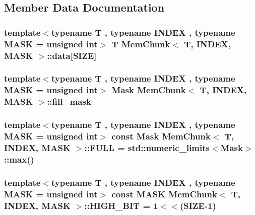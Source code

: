 \subsection{Member Data Documentation}
\hypertarget{structMemChunk_a09489aed8564c7ded0a29a029337073f}{
\subsubsection[{data}]{\setlength{\rightskip}{0pt plus 5cm}template$<$typename T , typename I\-N\-D\-E\-X , typename M\-A\-S\-K  = unsigned int$>$ T {\bf Mem\-Chunk}$<$ T, I\-N\-D\-E\-X, M\-A\-S\-K $>$\-::data\mbox{[}{\bf S\-I\-Z\-E}\mbox{]}}}\label{structMemChunk_a09489aed8564c7ded0a29a029337073f}
\hypertarget{structMemChunk_a739baec0d83624ec803a185b16197a41}{
\subsubsection[{fill\-\_\-mask}]{\setlength{\rightskip}{0pt plus 5cm}template$<$typename T , typename I\-N\-D\-E\-X , typename M\-A\-S\-K  = unsigned int$>$ {\bf Mask} {\bf Mem\-Chunk}$<$ T, I\-N\-D\-E\-X, M\-A\-S\-K $>$\-::fill\-\_\-mask}}\label{structMemChunk_a739baec0d83624ec803a185b16197a41}
\hypertarget{structMemChunk_a313702b7ec939b184863aabd61f7b714}{
\subsubsection[{F\-U\-L\-L}]{\setlength{\rightskip}{0pt plus 5cm}template$<$typename T , typename I\-N\-D\-E\-X , typename M\-A\-S\-K  = unsigned int$>$ const {\bf Mask} {\bf Mem\-Chunk}$<$ T, I\-N\-D\-E\-X, M\-A\-S\-K $>$\-::F\-U\-L\-L = std\-::numeric\-\_\-limits$<${\bf Mask}$>$\-::max()\hspace{0.3cm}{\ttfamily [static]}}}\label{structMemChunk_a313702b7ec939b184863aabd61f7b714}
\hypertarget{structMemChunk_a73881b56059fddd1c7151c205d6d806c}{
\subsubsection[{H\-I\-G\-H\-\_\-\-B\-I\-T}]{\setlength{\rightskip}{0pt plus 5cm}template$<$typename T , typename I\-N\-D\-E\-X , typename M\-A\-S\-K  = unsigned int$>$ const M\-A\-S\-K {\bf Mem\-Chunk}$<$ T, I\-N\-D\-E\-X, M\-A\-S\-K $>$\-::H\-I\-G\-H\-\_\-\-B\-I\-T = 1$<$$<$({\bf S\-I\-Z\-E}-\/1)\hspace{0.3cm}{\ttfamily [static]}}}\label{structMemChunk_a73881b56059fddd1c7151c205d6d806c}
